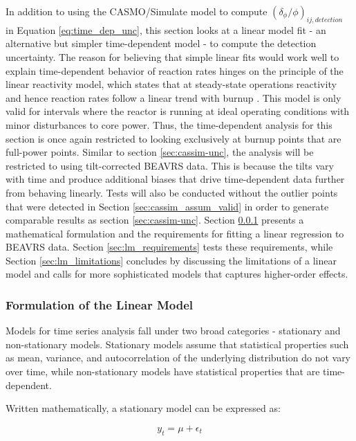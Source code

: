 \documentclass{article}
\begin{document}
In addition to using the CASMO/Simulate model to compute $\left(\delta_\phi/\phi\right)_{ij,detection}$ in Equation \ref{eq:time_dep_unc}, this section looks at a linear model fit - an alternative but simpler time-dependent model - to compute the detection uncertainty. The reason for believing that simple linear fits would work well to explain time-dependent behavior of reaction rates hinges on the principle of the linear reactivity model, which states that at steady-state operations reactivity and hence reaction rates follow a linear trend with burnup \cite{LRM}. This model is only valid for intervals where the reactor is running at ideal operating conditions with minor disturbances to core power. Thus, the time-dependent analysis for this section is once again restricted to looking exclusively at burnup points that are full-power points. Similar to section \ref{sec:cassim-unc}, the analysis will be restricted to using tilt-corrected BEAVRS data. This is because the tilts vary with time and produce additional biases that drive time-dependent data further from behaving linearly. Tests will also be conducted without the outlier points that were detected in Section \ref{sec:cassim_assum_valid} in order to generate comparable results as section \ref{sec:cassim-unc}. Section \ref{sec:lm_formulation} presents a mathematical formulation and the requirements for fitting a linear regression to BEAVRS data. Section \ref{sec:lm_requirements} tests these requirements, while Section \ref{sec:lm_limitations} concludes by discussing the limitations of a linear model and calls for more sophisticated models that captures higher-order effects.

\subsubsection{Formulation of the Linear Model}\label{sec:lm_formulation}

Models for time series analysis fall under two broad categories - stationary and non-stationary models. Stationary models assume that statistical properties such as mean, variance, and autocorrelation of the underlying distribution do not vary over time, while non-stationary models have statistical properties that are time-dependent. 

Written mathematically, a stationary model can be expressed as: 

\begin{equation}
  y_t=\mu+\epsilon_t
\end{equation}
\end{document}
